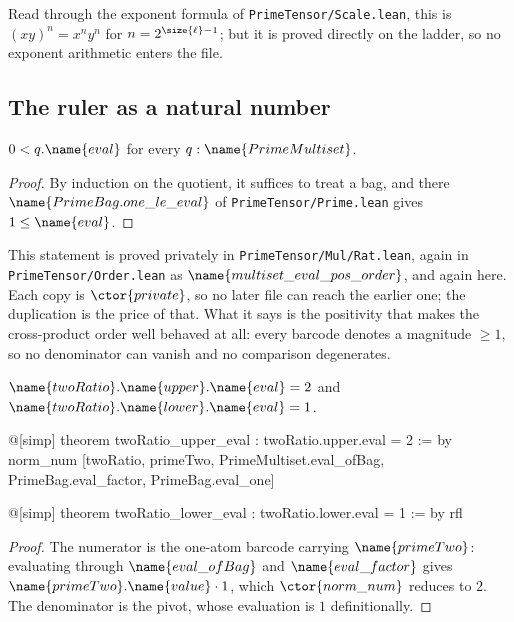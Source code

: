 Read through the exponent formula of \texttt{PrimeTensor/Scale.lean}, this is
$(xy)^{n} = x^{n} y^{n}$ for $n = 2^{\size{\ell}-1}$; but it is proved
directly on the ladder, so no exponent arithmetic enters the file.

\subsection{The ruler as a natural number}

\begin{lemma}
\label{Scale:Laws:lem:eval-pos}
$0 < q.\name{eval}$ for every $q : \name{PrimeMultiset}$.
\end{lemma}

\begin{proof}
By induction on the quotient, it suffices to treat a bag, and there
$\name{PrimeBag.one\_le\_eval}$ of \texttt{PrimeTensor/Prime.lean} gives
$1 \leq \name{eval}$.
\end{proof}

\begin{remark}\label{Scale:Laws:rem:third-time}
This statement is proved privately in \texttt{PrimeTensor/Mul/Rat.lean}, again
in \texttt{PrimeTensor/Order.lean} as $\name{multiset\_eval\_pos\_order}$, and
again here.  Each copy is $\ctor{private}$, so no later file can reach the
earlier one; the duplication is the price of that.  What it says is the
positivity that makes the cross-product order well behaved at all: every
barcode denotes a magnitude $\geq 1$, so no denominator can vanish and no
comparison degenerates.
\end{remark}

\begin{lemma}\label{Scale:Laws:lem:two-eval}
$\name{twoRatio}.\name{upper}.\name{eval} = 2$ and
$\name{twoRatio}.\name{lower}.\name{eval} = 1$.
\end{lemma}

\begin{leancode}
@[simp] theorem twoRatio_upper_eval : twoRatio.upper.eval = 2 := by
  norm_num [twoRatio, primeTwo, PrimeMultiset.eval_ofBag,
    PrimeBag.eval_factor, PrimeBag.eval_one]

@[simp] theorem twoRatio_lower_eval : twoRatio.lower.eval = 1 := by
  rfl
\end{leancode}

\begin{proof}
The numerator is the one-atom barcode carrying $\name{primeTwo}$: evaluating
through $\name{eval\_ofBag}$ and $\name{eval\_factor}$ gives
$\name{primeTwo}.\name{value} \cdot 1$, which $\ctor{norm\_num}$ reduces to
$2$.  The denominator is the pivot, whose evaluation is $1$ definitionally.
\end{proof}

